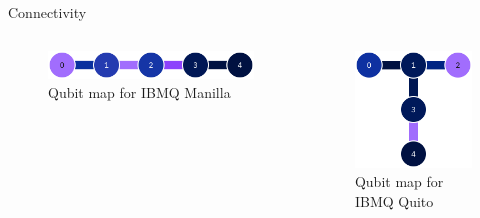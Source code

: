\documentclass{beamer}
\begin{document}
\begin{frame}{Connectivity}
    \begin{columns}
        \begin{figure}
            \centering
            \includegraphics[width=\columnwidth]{images/ibmq_manila_calibrations_readout_error_cx_map_2023-07-14T13_34_25Z.png}
            \caption{Qubit map for IBMQ Manilla}
        \end{figure}
        \begin{figure}
            \centering
            \includegraphics[width=0.7\columnwidth]{images/ibmq_quito_calibrations_readout_error_cx_map_2023-07-10T10_21_51Z.png}
            \caption{Qubit map for IBMQ Quito}
        \end{figure}
    \end{columns}
\end{frame}
\end{document}
